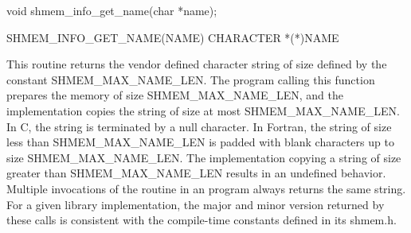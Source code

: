 \synC   %

void shmem_info_get_name(char *name); %

\synF   %

SHMEM_INFO_GET_NAME(NAME)   
CHARACTER *(*)NAME %

{
  This routine returns the vendor defined character string of size defined by the 
  constant SHMEM\_MAX\_NAME\_LEN. The program calling this function 
  prepares the memory of size SHMEM\_MAX\_NAME\_LEN, and the implementation copies the 
  string of size at most SHMEM\_MAX\_NAME\_LEN. In C, the string is terminated by a null character. 
  In Fortran, the string of size less than SHMEM\_MAX\_NAME\_LEN is padded with blank characters up to 
  size SHMEM\_MAX\_NAME\_LEN. The implementation copying a string of size greater than SHMEM\_MAX\_NAME\_LEN results 
  in an undefined behavior.
  Multiple invocations of the 
  routine in an \openshmem{} program always returns the same string. 
  For a given library implementation, the major and minor version returned by these calls is consistent with the compile-time constants defined in its shmem.h.
}
{
}
\eAPI

